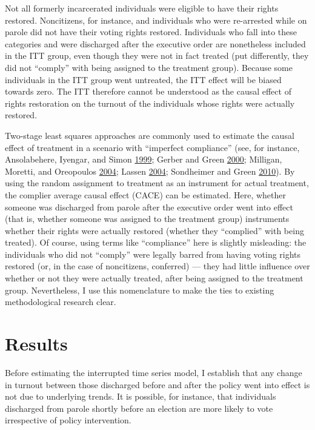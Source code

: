 \documentclass[
  12pt,
]{article}
\begin{document}
Not all formerly incarcerated individuals were eligible to have their rights restored. Noncitizens, for instance, and individuals who were re-arrested while on parole did not have their voting rights restored. Individuals who fall into these categories and were discharged after the executive order are nonetheless included in the ITT group, even though they were not in fact treated (put differently, they did not ``comply'' with being assigned to the treatment group). Because some individuals in the ITT group went untreated, the ITT effect will be biased towards zero. The ITT therefore cannot be understood as the causal effect of rights restoration on the turnout of the individuals whose rights were actually restored.

Two-stage least squares approaches are commonly used to estimate the causal effect of treatment in a scenario with ``imperfect compliance'' (see, for instance, Ansolabehere, Iyengar, and Simon \protect\hyperlink{ref-Ansolabehere1999}{1999}; Gerber and Green \protect\hyperlink{ref-Gerber2000}{2000}; Milligan, Moretti, and Oreopoulos \protect\hyperlink{ref-Milligan2004}{2004}; Lassen \protect\hyperlink{ref-Lassen2004}{2004}; Sondheimer and Green \protect\hyperlink{ref-Sondheimer2010}{2010}). By using the random assignment to treatment as an instrument for actual treatment, the complier average causal effect (CACE) can be estimated. Here, whether someone was discharged from parole after the executive order went into effect (that is, whether someone was assigned to the treatment group) instruments whether their rights were actually restored (whether they ``complied'' with being treated). Of course, using terms like ``compliance'' here is slightly misleading: the individuals who did not ``comply'' were legally barred from having voting rights restored (or, in the case of noncitizens, conferred) --- they had little influence over whether or not they were actually treated, after being assigned to the treatment group. Nevertheless, I use this nomenclature to make the ties to existing methodological research clear.

\hypertarget{results}{%
\section*{Results}\label{results}}

Before estimating the interrupted time series model, I establish that any change in turnout between those discharged before and after the policy went into effect is not due to underlying trends. It is possible, for instance, that individuals discharged from parole shortly before an election are more likely to vote irrespective of policy intervention.
\end{document}
